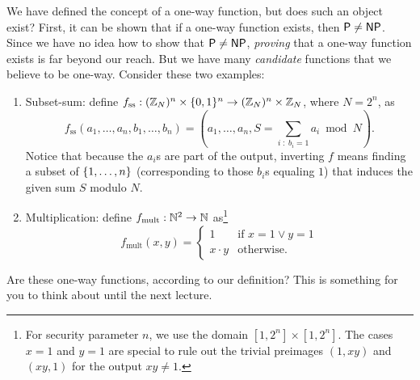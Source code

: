 \documentclass[11pt]{article}
\begin{document}
We have defined the concept of a one-way function, but does such an
object exist?  First, it can be shown that if a one-way function
exists, then $\mathsf{P} \neq \mathsf{NP}$.  Since we have no idea how to show that
$\mathsf{P} \neq \mathsf{NP}$, \emph{proving} that a one-way function exists is far
beyond our reach.  But we have many \emph{candidate} functions that we
believe to be one-way.  Consider these two examples:
\begin{enumerate}
\item Subset-sum: define $f_{\text{ss}} : (\mathbb{Z}_{N})^{n} \times \{0,1\}^{n}
  \to (\mathbb{Z}_{N})^{n} \times \mathbb{Z}_{N}$, where $N = 2^{n}$, as \[
  f_{\text{ss}}(a_{1}, \ldots, a_{n}, b_{1}, \ldots, b_{n}) = (a_{1},
  \ldots, a_{n}, S = \sum_{i\; :\; b_{i} = 1} a_{i} \bmod N). \]
  Notice that because the $a_{i}$s are part of the output, inverting
  $f$ means finding a subset of $\{1,\ldots,n\}$ (corresponding to
  those $b_{i}$s equaling $1$) that induces the given sum $S$ modulo
  $N$.
\item Multiplication: define $f_{\text{mult}} : \mathbb{N}^{2} \to \mathbb{N}$
  as\footnote{For security parameter $n$, we use the domain $[1,2^{n}]
    \times [1,2^{n}]$.  The cases $x=1$ and $y=1$ are special to rule
    out the trivial preimages $(1,xy)$ and $(xy, 1)$ for the output
    $xy \neq 1$.}
  \[
  f_{\text{mult}}(x,y) =
  \begin{cases}
    1 & \text{if } x=1 \vee y=1 \\
    x \cdot y & \text{otherwise.}
  \end{cases}
  \]
\end{enumerate}

Are these one-way functions, according to our definition?  This is
something for you to think about until the next lecture.
\end{document}
